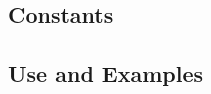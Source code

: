 \documentclass[english]{article}
\begin{document}
\subsection{Constants}

%
%
%
%
%
%
\subsection{Use and Examples}

%
%
\end{document}
